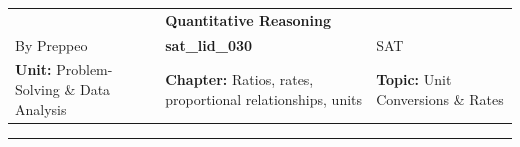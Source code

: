 \documentclass[11pt,paper=a4,answers]{exam}
\begin{document}
\begin{center}
    \centering
    \renewcommand{\arraystretch}{1.5}
    \begin{tabularx}{\textwidth}{YYY}
    & \normalsize\bf{{\Large{Quantitative Reasoning}}} & \\
    By Preppeo & \normalsize\bf{{sat\_lid\_030}} & SAT\\
    \normalsize{{\textbf{Unit:}} Problem-Solving \& Data Analysis} & 
    \normalsize{{\textbf{Chapter:}} Ratios, rates, proportional relationships, units} & 
    \normalsize{{\textbf{Topic:}} Unit Conversions \& Rates} 
    \\ \end{tabularx}
\end{center}
\par\noindent\rule{\textwidth}{1pt}
\end{document}

